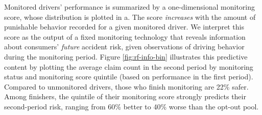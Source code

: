Monitored drivers' performance is summarized by a one-dimensional monitoring score, whose distribution is plotted in a. The score \textit{increases} with the amount of punishable behavior recorded for a given monitored driver. We interpret this score as the output of a fixed monitoring technology that reveals information about consumers' \emph{future} accident risk, given observations of driving behavior during the monitoring period. Figure \ref{fig:rf-info-bin} illustrates this predictive content by plotting the average claim count in the second period by monitoring status and monitoring score quintile (based on performance in the first period). Compared to unmonitored drivers, those who finish monitoring are 22\% safer. Among finishers, the quintile of their monitoring score strongly predicts their second-period risk, ranging from 60\% better to 40\% worse than the opt-out pool.

